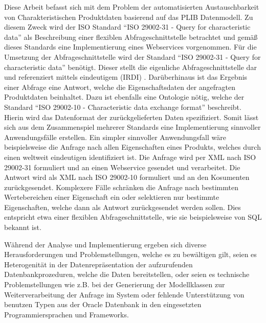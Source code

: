 Diese Arbeit befasst sich mit dem Problem der automatisierten Austauschbarkeit von Charakteristischen Produktdaten basierend auf das PLIB Datenmodell. Zu diesem Zweck wird der ISO Standard \enquote{ISO 29002-31 - Query for characteristic data} als Beschreibung einer flexiblen \gls{Abfrageschnittstelle} betrachtet und gemäß dieses Standards eine Implementierung eines \glspl{Webservice} vorgenommen. 
Für die Umsetzung der \gls{Abfrageschnittstelle} wird der Standard \enquote{ISO 29002-31 - Query for characteristic data} benötigt. Dieser stellt die eigenliche \gls{Abfrageschnittstelle} dar und referenziert mittels eindeutigem  (IRDI) . Darüberhinaus ist das Ergebnis einer Abfrage eine Antwort, welche die Eigenschaftsdaten der angefragten Produktdaten beinhaltet. Dazu ist ebenfalls eine Ontologie nötig, welche der Standard \enquote{ISO 29002-10 - Characteristic data exchange format} beschreibt. Hierin wird das Datenformat der zurückgelieferten Daten spezifiziert. Somit lässt sich aus dem Zusammenspiel mehrerer Standards eine Implementierung sinnvoller Anwendungsfälle erstellen. 
Ein simpler sinnvoller Anwendungsfall wäre beispielsweise die Anfrage nach allen Eigenschaften eines Produkts, welches durch einen weltweit eindeutigen  identifiziert ist. Die Anfrage wird per XML nach ISO 29002-31 formuliert und an einen \gls{Webservice} gesendet und verarbeitet. Die Antwort wird als XML nach ISO 29002-10 formuliert und an den Kosumenten zurückgesendet. Komplexere Fälle schränken die Anfrage nach bestimmten Wertebereichen einer Eigenschaft ein oder selektieren nur bestimmte Eigenschaften, welche dann als Antwort zurückgesendet werden sollen. Dies entspricht etwa einer flexiblen \gls{Abfrageschnittstelle}, wie sie beispielsweise von SQL bekannt ist.  

Während der Analyse und Implementierung ergeben sich diverse Herausforderungen und Problemstellungen, welche es zu bewältigen gilt, seien es Heterogenität in der Datenrepräsentation der aufzurufenden Datenbankprozeduren, welche die Daten bereitstellen, oder seien es technische Problemstellungen wie z.B. bei der Generierung der Modellklassen zur Weiterverarbeitung der Anfrage im System oder fehlende Unterstützung von benutzen Typen aus der Oracle Datenbank in den eingesetzten Programmiersprachen und Frameworks.  





